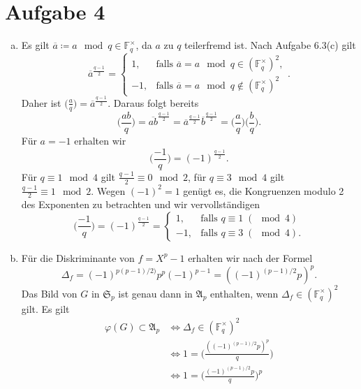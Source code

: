 \documentclass{article}
\begin{document}
    \section*{Aufgabe 4}
    \begin{enumerate}[(a)]
        \item Es gilt $\overline{a}\coloneqq a \mod q\in \mathbb{F}_q^\times$, da $a$ zu $q$ teilerfremd ist. Nach Aufgabe 6.3(c) gilt 
        \[
            \overline{a}^{\frac{q-1}{2}} = \begin{cases}
            1, &\text{falls }\overline{a} = a \mod q \in    (\mathbb{F}_q^\times)^2,\\
            -1,&\text{falls }\overline{a} = a \mod q \notin (\mathbb{F}_q^\times)^2
        \end{cases}.
        \]
        Daher ist $\big(\frac{a}{q}\big) = \overline{a}^{\frac{q-1}{2}}$. Daraus folgt bereits
        \[
            \biggl(\frac{ab}{q}\biggr) = \overline{ab}^\frac{q-1}{2} = \overline{a}^\frac{q-1}{2} \overline{b}^\frac{q-1}{2} = \biggl(\frac{a}{q}\biggr)\biggl(\frac{b}{q}\biggr).  
        \]
        Für $a = -1$ erhalten wir
        \[
            \biggl(\frac{-1}{q}\biggr) = (-1)^\frac{q-1}{2}.
        \]
        Für $q \equiv 1 \mod 4$ gilt $\frac{q-1}{2} \equiv 0 \mod 2$, für $q\equiv 3 \mod 4$ gilt $\frac{q-1}{2} \equiv 1 \mod 2$. Wegen $(-1)^2 = 1$ genügt es, die Kongruenzen modulo 2 des Exponenten zu betrachten und wir vervollständigen
        \[
            \biggl(\frac{-1}{q}\biggr) = (-1)^\frac{q-1}{2} = \begin{cases}
                1, &\text{falls }q\equiv 1\; (\mod 4)\\
                -1,&\text{falls }q\equiv 3\; (\mod 4).
            \end{cases}
        \]
        \item Für die Diskriminante von $f = X^p -1$ erhalten wir nach der Formel 
        \[ 
            \Delta_f = (-1)^{p(p-1)/2)} p^p(-1)^{p-1} = \left((-1)^{(p-1)/2}p\right)^p.
        \]
        Das Bild von $G$ in $\mathfrak{S}_p$ ist genau dann in $\mathfrak{A}_p$ enthalten, wenn $\Delta_f \in (\mathbb{F}_q^\times)^2$ gilt. Es gilt
        \begin{align*}
            \varphi(G) \subset \mathfrak{A}_p &\Leftrightarrow \Delta_f \in (\mathbb{F}_q^\times)^2\\
            &\Leftrightarrow 1 = \biggl(\frac{\left((-1)^{(p-1)/2}p\right)^p}{q}\biggr)\\
            &\Leftrightarrow 1 = \biggl(\frac{(-1)^{(p-1)/2}p}{q}\biggr)^p

\end{align*}
\end{enumerate}
\end{document}
